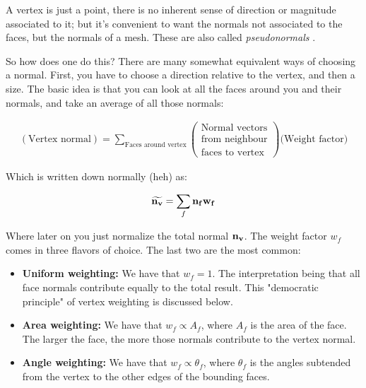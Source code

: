 A vertex is just a point, there is no inherent sense of direction
or magnitude associated to it; but it's convenient to want the normals
not associated to the faces, but the normals of a mesh. These are
also called \textit{pseudonormals} \cite{SDFnormal}.

\spa

So how does one do this? There are many somewhat equivalent
ways of choosing a normal. First, you have to choose a direction
relative to the vertex, and then a size. The basic idea is that
you can look at all the faces around you and their normals,
and take an average of all those normals:

\begin{definition}
    \begin{align*}
    (\text{Vertex normal}) = 
    \sum_{\text{Faces around vertex}} 
\begin{pmatrix}
\text{Normal vectors}\\
\text{from neighbour}\\
\text{faces to vertex}
\end{pmatrix}
\text{(Weight factor)}
\end{align*}

Which is written down normally (heh) as:

\begin{align*}
    \widetilde{\bf{n}_v} = 
    \sum_{f} \bf{n}_f w_f
\end{align*}

Where later on you just normalize the total normal
$\bf{n}_v$. 
The weight factor $w_f$ comes in three flavors of choice.
The last two are the most common:

\begin{itemize}
    \item \textbf{Uniform weighting:}
    We have that $w_f = 1$. The interpretation being that
    all face normals contribute equally to the total result.
    This "democratic principle" of vertex weighting is discussed
    below.
    
    \item \textbf{Area weighting:}
    We have that $w_f \propto A_f $, where $A_f$ is the area
    of the face. The larger the face, the more those normals
    contribute to the vertex normal.

    \item \textbf{Angle weighting:}
    We have that $w_f \propto \theta_f$, where $\theta_f$ is the
    angles subtended from the vertex to the other edges of the bounding
    faces. 
\end{itemize}
\end{definition}


